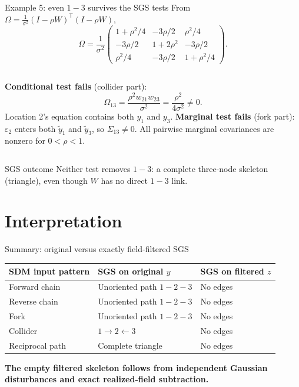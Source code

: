 \documentclass[aspectratio=169,11pt]{beamer}
\newcommand{\yt}{\widetilde y}
\newcommand{\good}[1]{\textcolor{Petrol}{\bfseries #1}}
\begin{document}
\begin{frame}{Example 5: even $1-3$ survives the SGS tests}
\small
From $\Omega=\frac1{\sigma^2}(I-\rho W)^{\mathsf T}(I-\rho W)$,
\[
\Omega=\frac1{\sigma^2}
\begin{pmatrix}
1+\rho^2/4 & -3\rho/2 & \rho^2/4\\
-3\rho/2 & 1+2\rho^2 & -3\rho/2\\
\rho^2/4 & -3\rho/2 & 1+\rho^2/4
\end{pmatrix}.
\]
\begin{columns}[T,totalwidth=\linewidth]
\textbf{Conditional test fails} (collider part):
\[\Omega_{13}=\frac{\rho^2w_{21}w_{23}}{\sigma^2}=\frac{\rho^2}{4\sigma^2}\ne0.\]
Location 2's equation contains both $y_1$ and $y_3$.
\textbf{Marginal test fails} (fork part):\\[1mm]
$\varepsilon_2$ enters both $\yt_1$ and $\yt_3$, so $\Sigma_{13}\ne0$. All pairwise marginal covariances are nonzero for $0<\rho<1$.
\end{columns}
\begin{block}{SGS outcome}
Neither test removes $1-3$: a complete three-node skeleton (triangle), even though $W$ has no direct $1-3$ link.
\end{block}
\end{frame}

\section{Interpretation}
\begin{frame}{Summary: original versus exactly field-filtered SGS}
\centering
\small
\renewcommand{\arraystretch}{1.35}
\begin{tabular}{@{}p{.26\linewidth}p{.32\linewidth}p{.29\linewidth}@{}}
\toprule
SDM input pattern & SGS on original $y$ & SGS on filtered $z$\\ \midrule
Forward chain & Unoriented path $1-2-3$ & No edges\\
Reverse chain & Unoriented path $1-2-3$ & No edges\\
Fork & Unoriented path $1-2-3$ & No edges\\
Collider & $1\to2\leftarrow3$ & No edges\\
Reciprocal path & Complete triangle & No edges\\
\bottomrule
\end{tabular}
\par\vspace{6mm}
\good{The empty filtered skeleton follows from independent Gaussian disturbances and exact realized-field subtraction.}
\end{frame}
\end{document}
